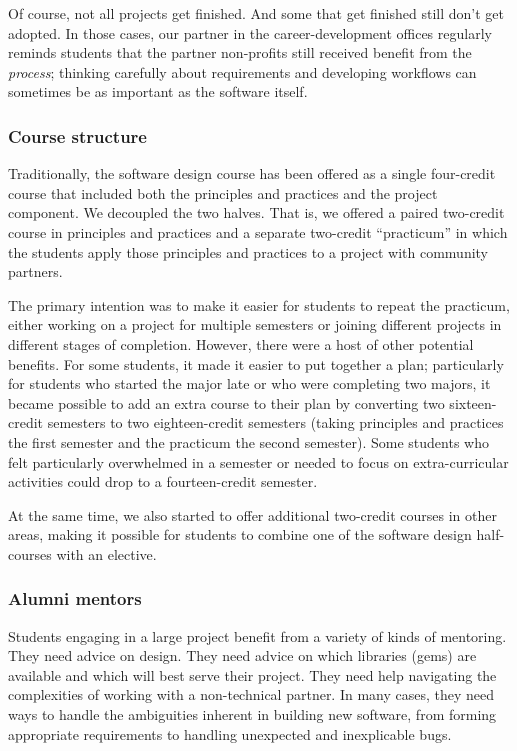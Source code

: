 Of course, not all projects get finished.  And some that get finished
still don't get adopted.  In those cases, our partner in the 
career-development offices regularly reminds students that the
partner non-profits still received benefit from the \textit{process};
thinking carefully about requirements and developing workflows can
sometimes be as important as the software itself.

\subsubsection{Course structure}

Traditionally, the software design course has been offered as a single
four-credit course that included both the principles and practices and
the project component.  We decoupled the two halves.  That is, we 
offered a paired two-credit course in principles and practices and
a separate two-credit ``practicum'' in which the students apply
those principles and practices to a project with community partners.

The primary intention was to make it easier for students to repeat
the practicum, either working on a project for multiple semesters
or joining different projects in different stages of completion.
However, there were a host of other potential benefits.  For some
students, it made it easier to put together a plan; particularly
for students who started the major late or who were completing two
majors, it became possible to add an extra course to their plan by
converting two sixteen-credit semesters to two eighteen-credit
semesters (taking principles and practices the first semester and
the practicum the second semester).  Some students who felt particularly
overwhelmed in a semester or needed to focus on extra-curricular activities
could drop to a fourteen-credit semester.

At the same time, we also started to offer additional two-credit
courses in other areas, making it possible for students to combine
one of the software design half-courses with an elective.

\subsubsection{Alumni mentors}

Students engaging in a large project benefit from a variety of kinds
of mentoring.  They need advice on design.  They need advice on
which libraries (gems) are available and which will best serve their
project.  They need help navigating the complexities of working
with a non-technical partner.  In many cases, they need ways to
handle the ambiguities inherent in building new software, from
forming appropriate requirements to handling unexpected and
inexplicable bugs.

